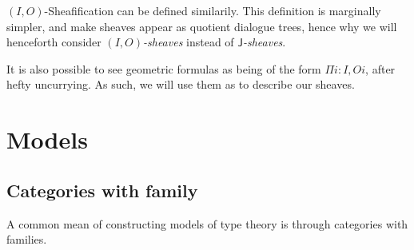 \documentclass[11pt]{article}
\newcommand{\0}{\mathbf{0}}
\newcommand{\1}{\mathbf{1}}
\begin{document}
$(I,O)$-Sheafification can be defined similarily. This definition is marginally simpler, and make sheaves appear as quotient dialogue trees, hence why we will henceforth consider \emph{$(I,O)$-sheaves} instead of \emph{$\mathsf{J}$-sheaves}.

It is also possible to see geometric formulas as being of the form $\Pi i : I, O i$, after hefty uncurrying. As such, we will use them as to describe our sheaves.

\section{Models}\label{Models}

\subsection{Categories with family}

A common mean of constructing models of type theory is through categories with families.
\end{document}
